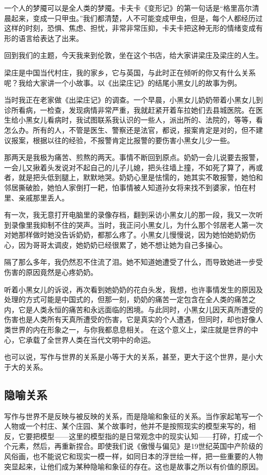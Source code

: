 \documentclass[12pt,a5paper]{ctexbook}
\begin{document}
一个人的梦魇可以是全人类的梦魇。卡夫卡《变形记》的第一句话是“格里高尔清晨起来，变成一只甲虫。”我们都清楚，人不可能变成甲虫，但是，每个人都经历过这样的时刻，恐惧、焦虑、担忧，非常非常压抑，卡夫卡把这种无形的情绪变成有形的语言给表达了出来。

回到我们的主题，今天我来到伦敦，坐在这个书店，给大家讲梁庄及梁庄的人生。

梁庄是中国当代村庄，我的家乡，它与英国，与此时正在倾听的你又有什么关系呢？我给大家讲一个小故事。以《出梁庄记》的结尾小黑女儿的故事为例。

当时我正在老家做《出梁庄记》的调查。一个早晨，小黑女儿奶奶带着小黑女儿到诊所看病，一检查，发现病情非常严重，我就赶紧开着车拉她们去县城医院。在医生给小黑女儿看病时，我试图联系我认识的一些人，派出所的、法院的，等等，看怎么办。所有的人，不管是医生、警察还是法官，都说，报案肯定是对的，但不建议报案，根据以往的经验，不报警肯定比报警的要伤害小黑女儿少一些。

那两天是我极为痛苦、煎熬的两天。事情不断回到原点。奶奶一会儿说要去报警，一会儿又揪着头发说对不起自己的儿子儿媳，把头往墙上撞，不如死了算了，再或者，就是把头低到腿上，默默地哭。奶奶心里是怯懦的，她其实不敢报警，她怕和邻居撕破脸，她怕人家倒打一耙，怕事情被人知道孙女将来找不到婆家，怕在村里、亲戚那里丢人。

有一次，我无意打开电脑里的录像存档，翻到采访小黑女儿的那一段，我又一次听到录像里我抑制不住的哭声。当时，我正问小黑女儿，为什么那个邻居老人第一次对她那样做时她没告诉奶奶，都那么疼了。小黑女儿慢慢说，因为她怕她奶奶伤心，因为哥哥太调皮，她奶奶已经很累了，她不想让她为自己多操心。

隔了那么多年，我仍然忍不住流了泪。她不知道她遭受了什么，而导致她进一步受伤害的原因竟然是心疼奶奶。

听着小黑女儿的诉说，再次看到她奶奶的花白头发，我想，也许事情发生的原因及处理的方式可能是中国式的，但那一刻，奶奶的痛苦一定包含在全人类的痛苦之内，它是人类永恒的痛苦和永远面临的困境。与此同时，小黑女儿因天真所遭受的伤害也是人类所有天真所遭受的伤害，它是真实的个人遭遇，但同时，却也好像人类世界的内在形象之一，与你我都息息相关。
在这个意义上，梁庄就是世界的中心，它承载了全世界人类在当代文明中的命运。

也可以说，写作与世界的关系是小等于大的关系，甚至，更大于这个世界，是小大于大的关系。

\subsection{隐喻关系}
写作与世界不是反映与被反映的关系，而是隐喻和象征的关系。当作家起笔写一个人物或一个村庄、某个庄园、某个故事时，他并不是按照现实的模型来写的，相反，它要把模型——这里的模型指的是日常观念中的现实认知——打碎，打成一个个元素，然后，再重新捏合。即使我们说《傲慢与偏见》是19世纪英国中产阶级的风俗画，也不能说它和现实一模一样，如同日本的浮世绘一样，把一些重要的人物突显起来，让他们成为某种隐喻和象征的存在。这也是故事之所以有价值的原因。
\end{document}
